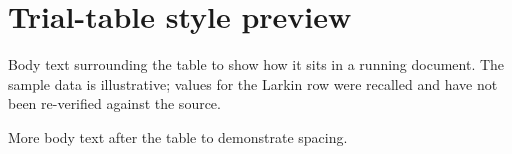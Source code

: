 \documentclass[11pt]{article}
\begin{document}
\section*{Trial-table style preview}

Body text surrounding the table to show how it sits in a running document.
The sample data is illustrative; values for the Larkin row were recalled and
have not been re-verified against the source.



More body text after the table to demonstrate spacing.



\end{document}
